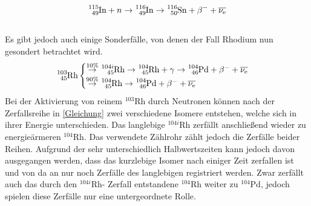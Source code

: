 \begin{align}
  \ce{^{115}_{49}In} +n \rightarrow \ce{^{116}_{49}In} \rightarrow \ce{^{116}_{50}Sn} + \beta^- + \overline{\nu_\text{e}}
\end{align}\\
Es gibt jedoch auch einige Sonderfälle, von denen der Fall Rhodium nun gesondert betrachtet wird.
\begin{align}
  \ce{^{103}_{45}Rh}
\begin{cases}
   \stackrel{10\%}{\rightarrow} \ce{^{104i}_{45}Rh} \rightarrow \ce{^{104}_{45}Rh} + \gamma \rightarrow \ce{^{104}_{46}Pd} + \beta^- + \overline{\nu_\text{e}}\\
   \stackrel{90\%}{\rightarrow}  \ce{^{104}_{45}Rh} \rightarrow \ce{^{104}_{46}Pd} + \beta^- + \overline{\nu_\text{e}}\\
\end{cases}\label{Gleichung}
\end{align}
Bei der Aktivierung von reinem $^{103}$Rh durch Neutronen können nach der Zerfallsreihe in \eqref{Gleichung}
zwei verschiedene Isomere entstehen, welche sich in ihrer Energie unterschieden. Das langlebige $^{104i}$Rh zerfällt anschließend wieder 
zu energieärmeren $^{104}$Rh.
Das verwendete Zählrohr zählt jedoch die Zerfälle beider Reihen. Aufgrund der sehr unterschiedlich Halbwertszeiten kann jedoch davon 
ausgegangen werden, dass das kurzlebige Isomer nach einiger Zeit zerfallen ist und von da an nur noch Zerfälle des langlebigen registriert werden. Zwar zerfällt auch das durch den $^{104i}$Rh- Zerfall entstandene $^{104}$Rh weiter zu $^{104}$Pd, jedoch spielen diese Zerfälle nur eine untergeordnete Rolle.

\label{sec:Theorie}
